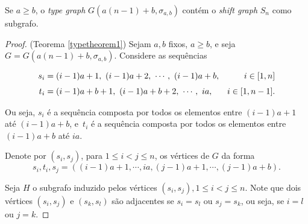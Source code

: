 \begin{teorema}\label{typetheorem1}
Se $a\geq b$, o \textit{type graph} $G(a(n-1)+b, \sigma_{a,b})$ contém o \textit{shift graph} $S_n$ como subgrafo.
\end{teorema}

\begin{proof}(Teorema \ref{typetheorem1})
Sejam $a,b$ fixos, $a \geq b$, e seja $G = G(a(n-1)+b, \sigma_{a,b})$. Considere as sequências

\begin{equation*}
\setlength{\jot}{6pt}
\begin{aligned}
s_i &= (i-1)a+1,\ (i-1)a+2,\ \cdots,\ (i-1)a+b, & i\in [1,n] \\
t_i &= (i-1)a+b+1,\ (i-1)a+b+2,\ \cdots,\ ia, & i\in [1,n-1].
\end{aligned}
\end{equation*}

Ou seja, $s_i$ é a sequência composta por todos os elementos entre $(i-1)a + 1$ até $(i-1)a+b$, e~$t_i$ é a sequência composta por todos os elementos entre $(i-1)a + b$ até $ia$.

Denote por $(s_i,s_j)$, para $1\leq i < j \leq n$, os vértices de $G$ da forma \[s_i,t_i,s_j = ((i-1)a+1,\cdots, ia, (j-1)a+1,\cdots, (j-1)a+b).\]

    
    

Seja $H$ o subgrafo induzido pelos vértices $(s_i,s_j), 1\leq i<j\leq n$. Note que dois vértices $(s_i,s_j)$ e $(s_k,s_l)$ são adjacentes se $s_i = s_l$ ou $s_j = s_k$, ou seja, se $i=l$ ou $j=k$.



\end{proof}
